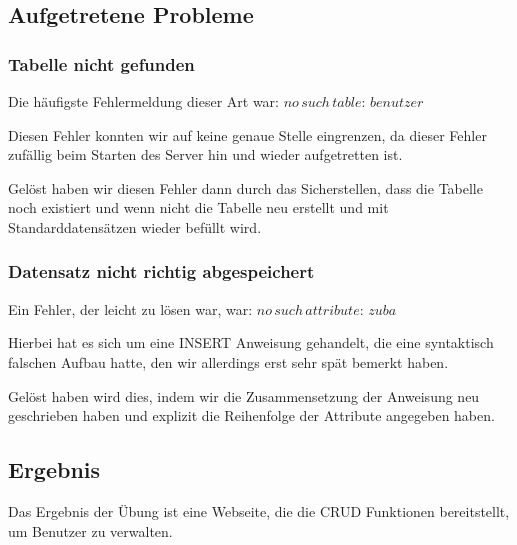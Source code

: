 \subsection{Aufgetretene Probleme}

\subsubsection{Tabelle nicht gefunden}
Die häufigste Fehlermeldung dieser Art war: $ no\,such\,table:\,benutzer $ 

Diesen Fehler konnten wir auf keine genaue Stelle eingrenzen, da dieser Fehler zufällig beim Starten des Server hin und wieder aufgetretten ist. 

Gelöst haben wir diesen Fehler dann durch das Sicherstellen, dass die Tabelle noch existiert und wenn nicht die Tabelle neu erstellt und mit Standarddatensätzen wieder befüllt wird.

\subsubsection{Datensatz nicht richtig abgespeichert}
Ein Fehler, der leicht zu lösen war, war: $ no\,such\,attribute:\,zuba $ 

Hierbei hat es sich um eine INSERT Anweisung gehandelt, die eine syntaktisch falschen Aufbau hatte, den wir allerdings erst sehr spät bemerkt haben. 

Gelöst haben wird dies, indem wir die Zusammensetzung der Anweisung neu geschrieben haben und explizit die Reihenfolge der Attribute angegeben haben.






\subsection{Ergebnis}

Das Ergebnis der Übung ist eine Webseite, die die CRUD Funktionen bereitstellt, um Benutzer zu verwalten.

